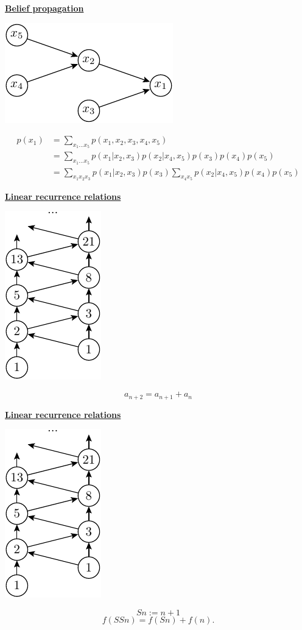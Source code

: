 \documentclass[11pt]{article}
\def\heading #1{\centerline{\underline{\bf\LARGE #1}}}
\def\vsp {\vskip 0.5cm}
\begin{document}
\newpage %

\heading{Belief propagation}
\centerline{\includegraphics[]{pic-belief.pdf}}
\begin{align*}
    p(x_1) &= \sum_{x_1...x_5} p(x_1, x_2, x_3, x_4, x_5) \\
    &= \sum_{x_1...x_5} p(x_1 | x_2, x_3)  p(x_2 | x_4, x_5) p(x_3) p(x_4) p( x_5)  \\
    &= \sum_{x_1x_2x_3} p(x_1 | x_2, x_3)  p(x_3) \sum_{x_4 x_5} p(x_2 | x_4, x_5) p(x_4) p( x_5) 
\end{align*}

\newpage %

\heading{Linear recurrence relations}

\vsp
\centerline{\includegraphics[]{pic-fibonacci.pdf}}
$$
    a_{n+2} = a_{n+1} + a_n
$$


\newpage %

\heading{Linear recurrence relations}

\vsp
\centerline{\includegraphics[]{pic-fibonacci.pdf}}
$$
    Sn := n+1
$$
$$
    f(SSn) = f(Sn) + f(n).
$$
\end{document}
